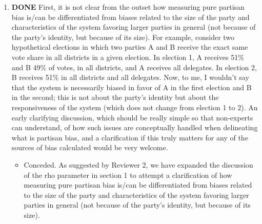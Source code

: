\documentclass{article}
\begin{document}
\begin{enumerate}
\item {\bfseries\sffamily DONE} First, it is not clear from the outset how measuring pure partisan bias is/can be differentiated from biases related to the size of the party and characteristics of the system favoring larger parties in general (not because of the party's identity, but because of its size). For example, consider two hypothetical elections in which two parties A and B receive the exact same vote share in all districts in a given election. In election 1, A receives 51\% and B 49\% of votes, in all districts, and A receives all delegates. In election 2, B receives 51\% in all districts and all delegates. Now, to me, I wouldn't say that the system is necessarily biased in favor of  A in the first election and B in the second; this is not about the party's identity but about the responsiveness of the system (which does not change from election 1 to 2). An early clarifying discussion, which should be really simple so that non-experts can understand, of how such issues are conceptually handled when delineating what is partisan bias, and a clarification if this truly matters for any of the sources of bias calculated would be very welcome.
\label{sec:orgheadline10}
\begin{itemize}
\item Conceded. As suggested by Reviewer 2, we have expanded the discussion of the rho parameter in section 1 to attempt a clarification of how measuring pure partisan bias is/can be differentiated from biases related to the size of the party and characteristics of the system favoring larger parties in general (not because of the party's identity, but because of its size).
\end{itemize}


\end{enumerate}
\end{document}
